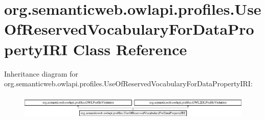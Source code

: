 \hypertarget{classorg_1_1semanticweb_1_1owlapi_1_1profiles_1_1_use_of_reserved_vocabulary_for_data_property_i_r_i}{\section{org.\-semanticweb.\-owlapi.\-profiles.\-Use\-Of\-Reserved\-Vocabulary\-For\-Data\-Property\-I\-R\-I Class Reference}
\label{classorg_1_1semanticweb_1_1owlapi_1_1profiles_1_1_use_of_reserved_vocabulary_for_data_property_i_r_i}
}
Inheritance diagram for org.\-semanticweb.\-owlapi.\-profiles.\-Use\-Of\-Reserved\-Vocabulary\-For\-Data\-Property\-I\-R\-I\-:\begin{figure}[H]
\begin{center}
\leavevmode
\includegraphics[height=1.194030cm]{classorg_1_1semanticweb_1_1owlapi_1_1profiles_1_1_use_of_reserved_vocabulary_for_data_property_i_r_i}
\end{center}
\end{figure}
